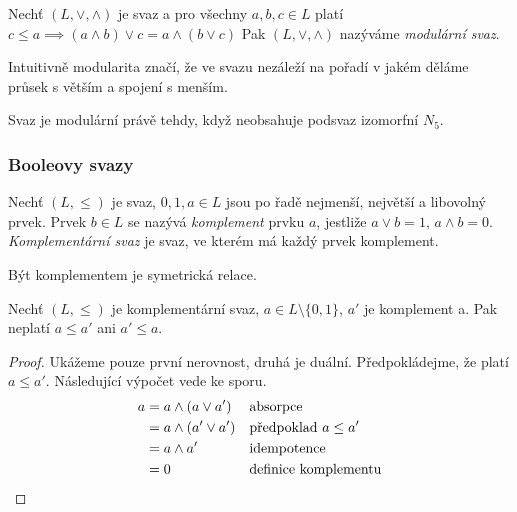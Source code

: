 \begin{definition}
    Nechť $(L, \vee, \wedge)$ je svaz a pro všechny $a, b, c \in L$
    platí
    $c \leq a \implies (a \wedge b) \vee c = a \wedge (b \vee c)$
    Pak $(L, \vee, \wedge)$ nazýváme {\em modulární svaz}.
\end{definition}

Intuitivně modularita značí, že
ve svazu nezáleží na pořadí v jakém děláme průsek
s větším a spojení s menším.


\begin{claim}
    Svaz je modulární právě tehdy, když neobsahuje podsvaz izomorfní
    $N_5$.
\end{claim}

\subsubsection{Booleovy svazy}

\begin{definition}
Nechť $(L, \leq)$ je svaz, $0, 1, a \in L$ jsou po řadě nejmenší, největší a libovolný prvek.
Prvek $b \in L$ se nazývá {\em komplement} prvku $a$, jestliže
$a \vee b = 1$, $a \wedge b = 0$.
{\em Komplementární svaz} je svaz, ve kterém má každý prvek komplement.
\end{definition}

Být komplementem je symetrická relace.

\begin{claim}
    \label{complements_incomparable}
    Nechť $(L, \leq)$ je komplementární svaz, $a \in L \setminus
    \{0,1\}$, $a'$ je komplement a.
    Pak neplatí $a \leq a'$ ani $a' \leq a$.
\end{claim}
\begin{proof}
    Ukážeme pouze první nerovnost, druhá je duální.
    Předpokládejme, že platí $a \leq a'$. Následující výpočet vede ke
    sporu.
\begin{align*}
    a &= a \wedge (a \vee a')  && \text{absorpce}\\
      &= a \wedge (a' \vee a') && \text{předpoklad } a \leq a'\\
      &= a \wedge a' && \text{idempotence}\\
      &= 0 && \text{definice komplementu}
\qedhere
\end{align*}
\end{proof}

